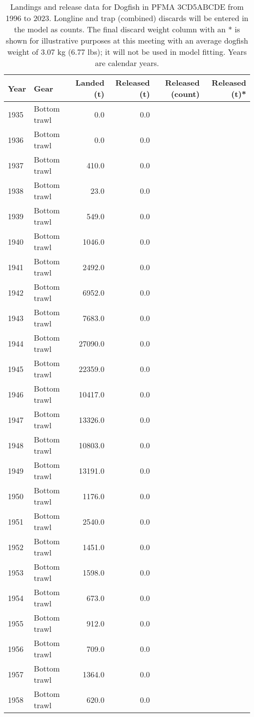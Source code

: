 
\begin{longtable}[t]{llrrrr}
\caption{Landings and release data for Dogfish in PFMA 3CD5ABCDE from 1996 to 2023. Longline and trap (combined) discards will be entered in the model as counts. The final discard weight column with an * is shown for illustrative purposes at this meeting with an average dogfish weight of 3.07 kg (6.77 lbs); it will not be used in model fitting. Years are calendar years.}\\
\toprule
Year & Gear & Landed (t) & Released (t) & Released (count) & Released (t)*\\
\midrule
1935 & Bottom trawl & 0.0 & 0.0 &  & \\
1936 & Bottom trawl & 0.0 & 0.0 &  & \\
1937 & Bottom trawl & 410.0 & 0.0 &  & \\
1938 & Bottom trawl & 23.0 & 0.0 &  & \\
1939 & Bottom trawl & 549.0 & 0.0 &  & \\
1940 & Bottom trawl & 1046.0 & 0.0 &  & \\
1941 & Bottom trawl & 2492.0 & 0.0 &  & \\
1942 & Bottom trawl & 6952.0 & 0.0 &  & \\
1943 & Bottom trawl & 7683.0 & 0.0 &  & \\
1944 & Bottom trawl & 27090.0 & 0.0 &  & \\
1945 & Bottom trawl & 22359.0 & 0.0 &  & \\
1946 & Bottom trawl & 10417.0 & 0.0 &  & \\
1947 & Bottom trawl & 13326.0 & 0.0 &  & \\
1948 & Bottom trawl & 10803.0 & 0.0 &  & \\
1949 & Bottom trawl & 13191.0 & 0.0 &  & \\
1950 & Bottom trawl & 1176.0 & 0.0 &  & \\
1951 & Bottom trawl & 2540.0 & 0.0 &  & \\
1952 & Bottom trawl & 1451.0 & 0.0 &  & \\
1953 & Bottom trawl & 1598.0 & 0.0 &  & \\
1954 & Bottom trawl & 673.0 & 0.0 &  & \\
1955 & Bottom trawl & 912.0 & 0.0 &  & \\
1956 & Bottom trawl & 709.0 & 0.0 &  & \\
1957 & Bottom trawl & 1364.0 & 0.0 &  & \\
1958 & Bottom trawl & 620.0 & 0.0 &  & \\

\end{longtable}
